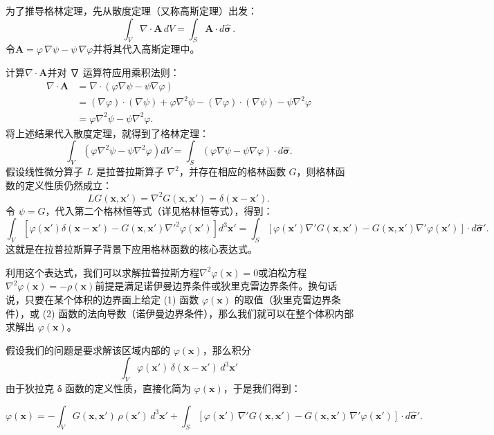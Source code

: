 为了推导格林定理，先从散度定理（又称高斯定理）出发：
$$
\int_V \nabla \cdot \mathbf{A} \, dV = \int_S \mathbf{A} \cdot d\hat{\boldsymbol{\sigma}}\,.~
$$
令$\mathbf{A} = \varphi \, \nabla \psi - \psi \, \nabla \varphi$并将其代入高斯定理中。

计算$\nabla \cdot \mathbf{A}$并对 ∇ 运算符应用乘积法则：
$$
\begin{aligned}
\nabla \cdot \mathbf{A} &= \nabla \cdot \left( \varphi \nabla \psi - \psi \nabla \varphi \right) \\
&= (\nabla \varphi) \cdot (\nabla \psi) + \varphi \nabla^2 \psi - (\nabla \varphi) \cdot (\nabla \psi) - \psi \nabla^2 \varphi \\
&= \varphi \nabla^2 \psi - \psi \nabla^2 \varphi.
\end{aligned}~
$$
将上述结果代入散度定理，就得到了格林定理：
$$
\int_V \left( \varphi \nabla^2 \psi - \psi \nabla^2 \varphi \right) dV = \int_S \left( \varphi \nabla \psi - \psi \nabla \varphi \right) \cdot d\hat{\boldsymbol{\sigma}}.~
$$
假设线性微分算子 $L$ 是拉普拉斯算子 $\nabla^2$，并存在相应的格林函数 $G$，则格林函数的定义性质仍然成立：
$$
L G(\mathbf{x}, \mathbf{x}') = \nabla^2 G(\mathbf{x}, \mathbf{x}') = \delta(\mathbf{x} - \mathbf{x}').~
$$
令 $\psi = G$，代入第二个格林恒等式（详见格林恒等式），得到：
$$
\int_V \left[ \varphi(\mathbf{x}') \delta(\mathbf{x} - \mathbf{x}') - G(\mathbf{x}, \mathbf{x}') \nabla'^2 \varphi(\mathbf{x}') \right] d^3\mathbf{x}' 
= \int_S \left[ \varphi(\mathbf{x}') \nabla' G(\mathbf{x}, \mathbf{x}') - G(\mathbf{x}, \mathbf{x}') \nabla' \varphi(\mathbf{x}') \right] \cdot d\hat{\boldsymbol{\sigma}}'.~
$$
这就是在拉普拉斯算子背景下应用格林函数的核心表达式。

利用这个表达式，我们可以求解拉普拉斯方程$\nabla^2 \varphi(\mathbf{x}) = 0$或泊松方程$\nabla^2 \varphi(\mathbf{x}) = -\rho(\mathbf{x})$前提是满足诺伊曼边界条件或狄里克雷边界条件。换句话说，只要在某个体积的边界面上给定 (1) 函数 $\varphi(\mathbf{x})$ 的取值（狄里克雷边界条件），或 (2) 函数的法向导数（诺伊曼边界条件），那么我们就可以在整个体积内部求解出 $\varphi(\mathbf{x})$。

假设我们的问题是要求解该区域内部的 $\varphi(\mathbf{x})$，那么积分
$$
\int_V \varphi(\mathbf{x}')\,\delta(\mathbf{x} - \mathbf{x}')\,d^3\mathbf{x}'~
$$
由于狄拉克 δ 函数的定义性质，直接化简为 $\varphi(\mathbf{x})$，于是我们得到：

$$
\varphi(\mathbf{x}) = -\int_V G(\mathbf{x}, \mathbf{x}')\,\rho(\mathbf{x}')\,d^3\mathbf{x}' + \int_S \left[ \varphi(\mathbf{x}')\,\nabla' G(\mathbf{x}, \mathbf{x}') - G(\mathbf{x}, \mathbf{x}')\,\nabla' \varphi(\mathbf{x}') \right] \cdot d\hat{\boldsymbol{\sigma}}'.~
$$

